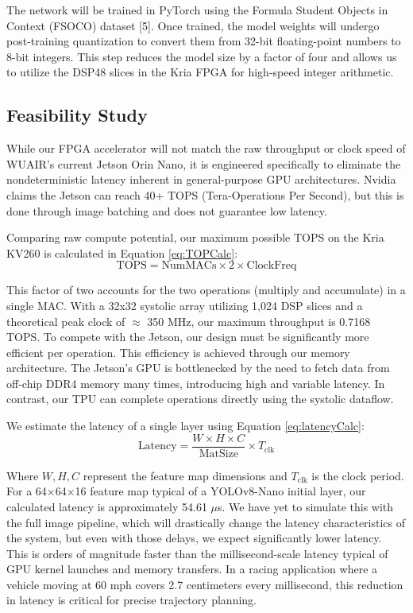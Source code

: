 \documentclass[11pt,a4paper,twoside]{article}
\begin{document}
The network will be trained in PyTorch using the Formula Student Objects in Context (FSOCO) dataset [5]. Once trained, the model weights will undergo post-training quantization to convert them from 32-bit floating-point numbers to 8-bit integers. This step reduces the model size by a factor of four and allows us to utilize the DSP48 slices in the Kria FPGA for high-speed integer arithmetic.

\subsection{Feasibility Study}

While our FPGA accelerator will not match the raw throughput or clock speed of WUAIR's current Jetson Orin Nano, it is engineered specifically to eliminate the nondeterministic latency inherent in general-purpose GPU architectures. Nvidia claims the Jetson can reach 40+ TOPS (Tera-Operations Per Second), but this is done through image batching and does not guarantee low latency.

Comparing raw compute potential, our maximum possible TOPS on the Kria KV260 is calculated in Equation \ref{eq:TOPCalc}: 
\begin{equation} \text{TOPS} = \text{NumMACs} \times 2 \times \text{ClockFreq} \label{eq:TOPCalc} \end{equation}

This factor of two accounts for the two operations (multiply and accumulate) in a single MAC. With a 32x32 systolic array utilizing 1,024 DSP slices and a theoretical peak clock of $\approx$ 350 MHz, our maximum throughput is 0.7168 TOPS. To compete with the Jetson, our design must be significantly more efficient per operation. This efficiency is achieved through our memory architecture. The Jetson’s GPU is bottlenecked by the need to fetch data from off-chip DDR4 memory many times, introducing high and variable latency. In contrast, our TPU can complete operations directly using the systolic dataflow.

We estimate the latency of a single layer using Equation \ref{eq:latencyCalc}: 
\begin{equation} \text{Latency} = \frac{W \times H \times C}{\text{MatSize}} \times T_{\text{clk}} \label{eq:latencyCalc} \end{equation}

Where $W, H, C$ represent the feature map dimensions and $T_{\text{clk}}$ is the clock period. For a 64×64×16 feature map typical of a YOLOv8-Nano initial layer, our calculated latency is approximately 54.61 $\mu$s. We have yet to simulate this with the full image pipeline, which will drastically change the latency characteristics of the system, but even with those delays, we expect significantly lower latency. This is orders of magnitude faster than the millisecond-scale latency typical of GPU kernel launches and memory transfers. In a racing application where a vehicle moving at 60 mph covers 2.7 centimeters every millisecond, this reduction in latency is critical for precise trajectory planning.
\end{document}
